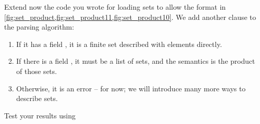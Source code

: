 
%

%

\begin{codeexercise}
    Extend now the code you wrote for loading sets to allow the format in \cref{fig:set_product,fig:set_product11,fig:set_product10}.
    We add another clause to the parsing algorithm:
    \begin{enumerate}
        \item If it has a field , it is a finite set described with elements directly.
        \item If there is a field , it must be a list of sets, and the semantics is the product of those sets.
        \item Otherwise, it is an error -- for now; we will introduce many more ways to describe sets.
    \end{enumerate}
    Test your results using
\end{codeexercise}
